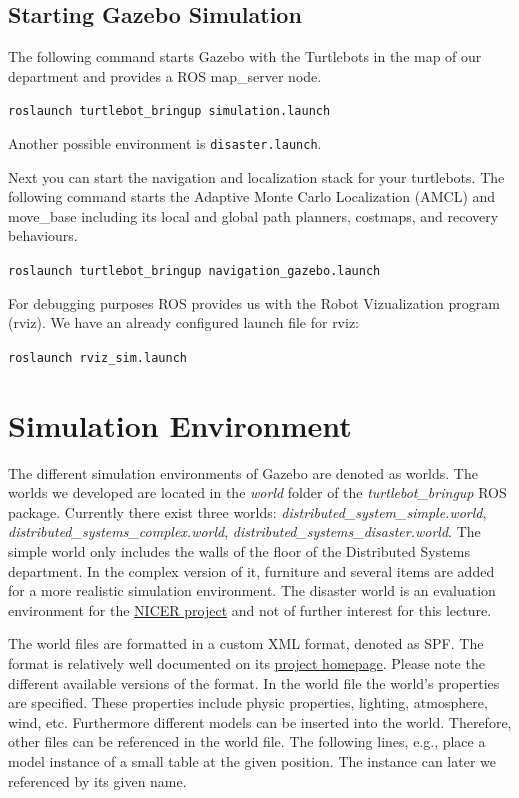 \subsection{Starting Gazebo Simulation}
\label{ssec:StartSimulation}

The following command starts Gazebo with the Turtlebots in the map of our department and provides a ROS map\_server node.

\verb$roslaunch turtlebot_bringup simulation.launch$

Another possible environment is \verb$disaster.launch$.

Next you can start the navigation and localization stack for your turtlebots. The following command starts the Adaptive Monte Carlo Localization (AMCL) and move\_base including its local and global path planners, costmaps, and recovery behaviours.

\verb$roslaunch turtlebot_bringup navigation_gazebo.launch$

For debugging purposes ROS provides us with the Robot Vizualization program (rviz). We have an already configured launch file for rviz:

\verb$roslaunch rviz_sim.launch$

\section{Simulation Environment}
\label{sec:SimulationEnvironment}

The different simulation environments of Gazebo are denoted as worlds. The worlds we developed are located in the \emph{world} folder of the \emph{turtlebot\_bringup} ROS package. Currently there exist three worlds: \emph{distributed\_system\_simple.world}, \emph{distributed\_sys\-tems\_com\-plex.world}, \emph{distributed\_systems\_disaster.world}. The simple world only includes the walls of the floor of the Distributed Systems department. In the complex version of it, furniture and several items are added for a more realistic simulation environment. The disaster world is an evaluation environment for the \href{http://www.uni-kassel.de/eecs/fachgebiete/vs/research/nicer.html}{NICER project} and not of further interest for this lecture. 

The world files are formatted in a custom XML format, denoted as SPF. The format is relatively well documented on its \href{http://sdformat.org}{project homepage}. Please note the different available versions of the format. In the world file the world's properties are specified. These properties include physic properties, lighting, atmosphere, wind, etc. Furthermore different models can be inserted into the world. Therefore, other files can be referenced in the world file. The following lines, e.g., place a model instance of a small table at the given position. The instance can later we referenced by its given name.

